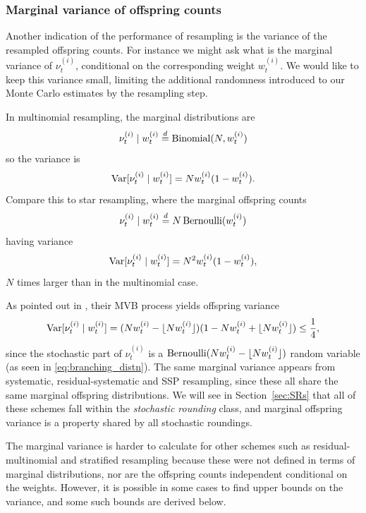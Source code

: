 \subsubsection{Marginal variance of offspring counts}
Another indication of the performance of resampling is the variance of the resampled offspring counts. For instance we might ask what is the marginal variance of $\nu_t^{(i)}$, conditional on the corresponding weight $w_t^{(i)}$. We would like to keep this variance small, limiting the additional randomness introduced to our Monte Carlo estimates by the resampling step.

In multinomial resampling, the marginal distributions are
\begin{equation*}
\nu_t^{(i)} \mid w_t^{(i)} 
\overset{d}{=} \operatorname{Binomial}(N, w_t^{(i)})
\end{equation*}
so the variance is
\begin{equation*}
\operatorname{Var}[ \nu_t^{(i)} \mid w_t^{(i)} ]
= N w_t^{(i)} ( 1- w_t^{(i)} ) .
\end{equation*}
Compare this to star resampling, where the marginal offspring counts
\begin{equation*}
\nu_t^{(i)} \mid w_t^{(i)} 
\overset{d}{=} N \operatorname{Bernoulli}( w_t^{(i)} )
\end{equation*}
having variance
\begin{equation*}
\operatorname{Var}[ \nu_t^{(i)} \mid w_t^{(i)} ]
= N^2 w_t^{(i)} ( 1- w_t^{(i)} ) ,
\end{equation*}
$N$ times larger than in the multinomial case.

As pointed out in \textcite[p.557]{crisan1999}, their MVB process yields offspring variance
\begin{equation*}
\operatorname{Var}[ \nu_t^{(i)} \mid w_t^{(i)} ]
= ( Nw_t^{(i)} -\lfloor N w_t^{(i)} \rfloor )(1- Nw_t^{(i)} + \lfloor N w_t^{(i)} \rfloor) 
\leq \frac{1}{4} ,
\end{equation*}
since the stochastic part of $\nu_t^{(i)}$ is a $\operatorname{Bernoulli}( Nw_t^{(i)} -\lfloor N w_t^{(i)} \rfloor )$ random variable (as seen in \eqref{eq:branching_distn}).
The same marginal variance appears from systematic, residual-systematic and SSP resampling, since these all share the same marginal offspring distributions. We will see in Section~\ref{sec:SRs} that all of these schemes fall within the \emph{stochastic rounding} class, and marginal offspring variance is a property shared by all stochastic roundings.

The marginal variance is harder to calculate for other schemes such as residual-multi\-nomial and stratified resampling because these were not defined in terms of marginal distributions, nor are the offspring counts independent conditional on the weights.
However, it is possible in some cases to find upper bounds on the variance, and some such bounds are derived below.

